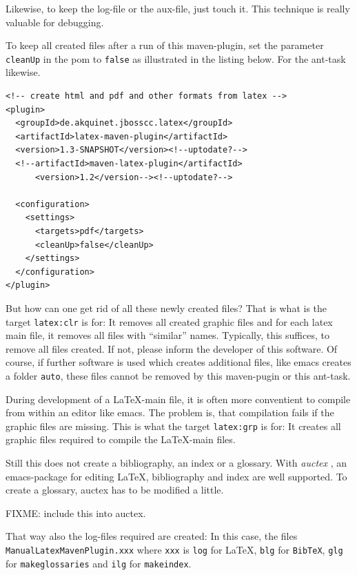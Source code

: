 \documentclass[12pt]{book}
\renewcommand{\index}[1]{ }
\begin{document}
Likewise, to keep the log-file or the aux-file, just touch it. 
This technique is really valuable for debugging. 

To keep all created files after a run of this maven-plugin, 
set the parameter \texttt{cleanUp} in the pom 
to \texttt{false} as illustrated in the listing below. 
For the ant-task likewise. 
%
\lstset{language=xml, basicstyle=\small}
\begin{lstlisting}
<!-- create html and pdf and other formats from latex -->
<plugin>
  <groupId>de.akquinet.jbosscc.latex</groupId>
  <artifactId>latex-maven-plugin</artifactId>
  <version>1.3-SNAPSHOT</version><!--uptodate?-->
  <!--artifactId>maven-latex-plugin</artifactId>
      <version>1.2</version--><!--uptodate?-->
	
  <configuration>
    <settings>
      <targets>pdf</targets>
      <cleanUp>false</cleanUp>
    </settings>
  </configuration>
</plugin>
\end{lstlisting}


But how can one get rid of all these newly created files? 
That is what is the target \texttt{latex:clr} is for: 
It removes all created graphic files 
and for each latex main file, it removes all files with ``similar'' names. 
Typically, this suffices, to remove all files created. 
If not, please inform the developer of this software. 
Of course, if further software is used which creates additional files, 
like emacs creates a folder \texttt{auto}, 
these files cannot be removed by this maven-pugin or this ant-task. 

During development of a \LaTeX-main file, 
it is often more conventient to compile from within an editor like emacs. 
The problem is, that compilation fails if the graphic files are missing. 
This is what the target \texttt{latex:grp} is for: 
It creates all graphic files required to compile the \LaTeX-main files. 

Still this does not create a bibliography, an index or a glossary. 
With {\em auctex}\index{auctex}, an emacs-package for editing \LaTeX, 
bibliography and index are well supported. 
To create a glossary, auctex has to be modified a little. 

FIXME: include this into auctex. 

That way also the log-files required are created: 
In this case, the files \texttt{ManualLatexMavenPlugin.xxx} 
where \texttt{xxx} is \texttt{log} for \LaTeX, \texttt{blg} for \texttt{BibTeX}, 
\texttt{glg} for \texttt{makeglossaries} and \texttt{ilg} for \texttt{makeindex}. 
\end{document}
